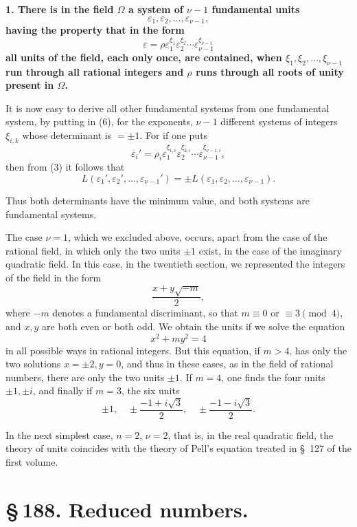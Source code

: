 \documentclass[11pt]{article}
\begin{document}
\textbf{1. There is in the field $\Omega$ a system of $\nu-1$ fundamental units}
\begin{equation}
\varepsilon_1,\varepsilon_2,\ldots,\varepsilon_{\nu-1},
\tag{5}
\end{equation}
\textbf{having the property that in the form}
\begin{equation}
\varepsilon=\rho\varepsilon_1^{\xi_1}\varepsilon_2^{\xi_2}\cdots\varepsilon_{\nu-1}^{\xi_{\nu-1}}
\tag{6}
\end{equation}
\textbf{all units of the field, each only once, are contained, when $\xi_1,\xi_2,\ldots,\xi_{\nu-1}$ run through all rational integers and $\rho$ runs through all roots of unity present in $\Omega$.}

It is now easy to derive all other fundamental systems from one fundamental system, by putting in (6), for the exponents, $\nu-1$ different systems of integers $\xi_{i,k}$ whose determinant is $=\pm1$. For if one puts
\[
\varepsilon_i'=\rho_i\varepsilon_1^{\xi_{1,i}}\varepsilon_2^{\xi_{2,i}}\cdots\varepsilon_{\nu-1}^{\xi_{\nu-1,i}},
\]
then from (3) it follows that
\[
L(\varepsilon_1',\varepsilon_2',\ldots,\varepsilon_{\nu-1}')=\pm L(\varepsilon_1,\varepsilon_2,\ldots,\varepsilon_{\nu-1}).
\]

Thus both determinants have the minimum value, and both systems are fundamental systems.

The case $\nu=1$, which we excluded above, occurs, apart from the case of the rational field, in which only the two units $\pm1$ exist, in the case of the imaginary quadratic field. In this case, in the twentieth section, we represented the integers of the field in the form
\[
\frac{x+y\sqrt{-m}}{2},
\]
where $-m$ denotes a fundamental discriminant, so that $m\equiv0$ or $\equiv3\pmod 4$, and $x,y$ are both even or both odd. We obtain the units if we solve the equation
\[
x^2+my^2=4
\]
in all possible ways in rational integers. But this equation, if $m>4$, has only the two solutions $x=\pm2,y=0$, and thus in these cases, as in the field of rational numbers, there are only the two units $\pm1$. If $m=4$, one finds the four units $\pm1,\pm i$, and finally if $m=3$, the six units
\[
\pm1,
\quad \pm\frac{-1+i\sqrt3}{2},
\quad \pm\frac{-1-i\sqrt3}{2}.
\]

In the next simplest case, $n=2$, $\nu=2$, that is, in the real quadratic field, the theory of units coincides with the theory of Pell's equation treated in \S~127 of the first volume.

\clearpage
\section*{\S\,188. Reduced numbers.}
\end{document}
